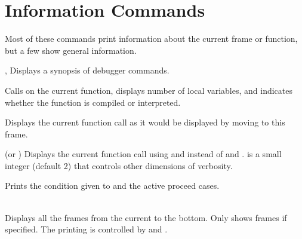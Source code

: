 \section{Information Commands}

Most of these commands print information about the current frame or
function, but a few show general information.

\begin{Lentry}

\item[\code{help}, \code{?}]
Displays a synopsis of debugger commands.

\item[\code{describe}]
Calls  on the current function, displays number of local
variables, and indicates whether the function is compiled or interpreted.

\item[\code{print}]
Displays the current function call as it would be displayed by moving to
this frame.

\item[\code{vprint} (or \code{pp}) \mopt{\var{verbosity}}]%
Displays the current function call using  and
 instead of  and
.   is a small integer
(default 2) that controls other dimensions of verbosity.

\item[\code{error}]
Prints the condition given to  and the active
proceed cases.

\item[\code{backtrace} \mopt{\var{n}}]\hfill\\
Displays all the frames from the current to the bottom.  Only shows
 frames if specified.  The printing is controlled by
 and .

% 
% 
% 
\end{Lentry}



